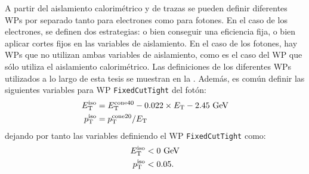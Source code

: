 \begin{table}[ht!]
    \caption{Resumen de los \ac{WP} de aislamiento para electrones y fotones usados a lo largo de esta tesis.}
    \label{fig:objects:egamma:iso:iso_table}
\end{table}

A partir del aislamiento calorimétrico y de trazas se pueden definir diferentes \acp{WP} por separado tanto para electrones como para fotones. En el caso de los electrones, se definen dos estrategias: o bien conseguir una eficiencia fija, o bien aplicar cortes fijos en las variables de aislamiento. En el caso de los fotones, hay \acp{WP} que no utilizan ambas variables de aislamiento, como es el caso del \ac{WP} que sólo utiliza el aislamiento calorimétrico. Las definiciones de los diferentes \acp{WP} utilizados a lo largo de esta tesis se muestran en la \Tab{\ref{fig:objects:egamma:iso:iso_table}}. Además, es común definir las siguientes variables para \ac{WP} \texttt{FixedCutTight} del fotón:
\begin{align}
    E_{\text{T}}^{\text{iso}} &= E_{\text{T}}^{\text{cone40}} - 0.022 \times E_{\text{T}} - 2.45~\text{GeV}\\
    p_{\text{T}}^{\text{iso}} &= p_{\text{T}}^{\text{cone20}} / E_{\text{T}}
\end{align}
dejando por tanto las variables definiendo el \ac{WP} \texttt{FixedCutTight} como:
\begin{align}
    E_{\text{T}}^{\text{iso}} &< 0 ~\text{GeV}\\
    p_{\text{T}}^{\text{iso}} &< 0.05.
\end{align}















